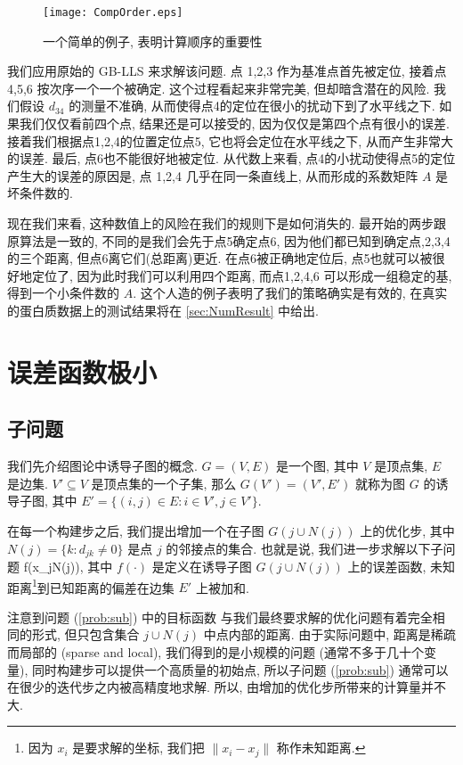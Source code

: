 \documentclass{CASthesis_zzk}
\begin{document}
\begin{figure}[htp]
  \centering
  \texttt{[image: CompOrder.eps]}\\
  \caption{一个简单的例子, 表明计算顺序的重要性}
  \label{fig:CompOrder}
\end{figure}

我们应用原始的 GB-LLS 来求解该问题. 
点 1,2,3 作为基准点首先被定位, 接着点 4,5,6 按次序一个一个被确定.
这个过程看起来非常完美, 但却暗含潜在的风险.
我们假设 $d_{34}$ 的测量不准确, 从而使得点4的定位在很小的扰动下到了水平线之下.
如果我们仅仅看前四个点, 结果还是可以接受的, 因为仅仅是第四个点有很小的误差. 
接着我们根据点1,2,4的位置定位点5,
它也将会定位在水平线之下, 从而产生非常大的误差.
最后, 点6也不能很好地被定位.
从代数上来看, 点4的小扰动使得点5的定位产生大的误差的原因是,
点 1,2,4 几乎在同一条直线上, 从而形成的系数矩阵 $A$ 是坏条件数的.

现在我们来看, 这种数值上的风险在我们的规则下是如何消失的.
最开始的两步跟原算法是一致的, 不同的是我们会先于点5确定点6,
因为他们都已知到确定点,2,3,4 的三个距离, 但点6离它们(总距离)更近.
在点6被正确地定位后, 点5也就可以被很好地定位了,
因为此时我们可以利用四个距离, 而点1,2,4,6 可以形成一组稳定的基,
得到一个小条件数的 $A$.
这个人造的例子表明了我们的策略确实是有效的, 
在真实的蛋白质数据上的测试结果将在 \ref{sec:NumResult} 中给出.


\section{误差函数极小}
\label{sec:opt}
\subsection{子问题}
我们先介绍图论中诱导子图的概念. 
$G=(V,E)$ 是一个图, 其中 $V$ 是顶点集, $E$ 是边集.
$V'\subseteq V$ 是顶点集的一个子集, 
那么 $G(V')=(V',E')$ 就称为图 $G$ 的诱导子图, 
其中 $E'=\{(i,j)\in E: i\in V', j\in V'\}$.

在每一个构建步之后, 我们提出增加一个在子图 $G(j\cup N(j))$ 上的优化步, 
其中 $N(j)=\{k: d_{jk}\neq 0\}$ 是点 $j$ 的邻接点的集合. 
也就是说, 我们进一步求解以下子问题
\be \min  f(x_{j\cup N(j)}), \label{prob:sub}\ee
其中 $f(\cdot)$ 是定义在诱导子图 $G(j\cup N(j))$ 上的误差函数, 
未知距离\footnote{因为 $x_i$ 是要求解的坐标, 我们把 $\|x_i-x_j\|$ 称作未知距离.}到已知距离的偏差在边集 $E'$ 上被加和. 

注意到问题 (\ref{prob:sub}) 中的目标函数
与我们最终要求解的优化问题有着完全相同的形式,
但只包含集合 $j\cup N(j)$ 中点内部的距离.
由于实际问题中, 距离是稀疏而局部的 (sparse and local),
我们得到的是小规模的问题 (通常不多于几十个变量),
同时构建步可以提供一个高质量的初始点,
所以子问题 (\ref{prob:sub}) 通常可以在很少的迭代步之内被高精度地求解.
所以, 由增加的优化步所带来的计算量并不大.
\end{document}
